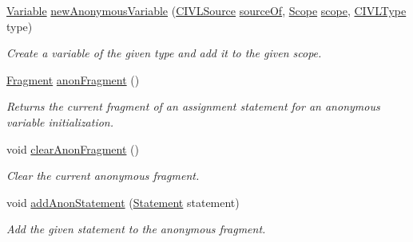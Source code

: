 \begin{DoxyCompactItemize}
\hyperlink{interfaceedu_1_1udel_1_1cis_1_1vsl_1_1civl_1_1model_1_1IF_1_1variable_1_1Variable}{Variable} \hyperlink{classedu_1_1udel_1_1cis_1_1vsl_1_1civl_1_1model_1_1common_1_1CommonModelFactory_a6803d8c7acd197424c72bef1975c9cba}{new\+Anonymous\+Variable} (\hyperlink{interfaceedu_1_1udel_1_1cis_1_1vsl_1_1civl_1_1model_1_1IF_1_1CIVLSource}{C\+I\+V\+L\+Source} \hyperlink{classedu_1_1udel_1_1cis_1_1vsl_1_1civl_1_1model_1_1common_1_1CommonModelFactory_afd3890efdff35b4597ab7ed14fbeffae}{source\+Of}, \hyperlink{interfaceedu_1_1udel_1_1cis_1_1vsl_1_1civl_1_1model_1_1IF_1_1Scope}{Scope} \hyperlink{classedu_1_1udel_1_1cis_1_1vsl_1_1civl_1_1model_1_1common_1_1CommonModelFactory_ace176067c807333f8832ee6b7ffcddfa}{scope}, \hyperlink{interfaceedu_1_1udel_1_1cis_1_1vsl_1_1civl_1_1model_1_1IF_1_1type_1_1CIVLType}{C\+I\+V\+L\+Type} type)
\begin{DoxyCompactList}\small\item\em Create a variable of the given type and add it to the given scope. \end{DoxyCompactList}\item 
\hyperlink{interfaceedu_1_1udel_1_1cis_1_1vsl_1_1civl_1_1model_1_1IF_1_1Fragment}{Fragment} \hyperlink{classedu_1_1udel_1_1cis_1_1vsl_1_1civl_1_1model_1_1common_1_1CommonModelFactory_a1ba6a95c6ef2119f7bace4ba8e02d6fa}{anon\+Fragment} ()
\begin{DoxyCompactList}\small\item\em Returns the current fragment of an assignment statement for an anonymous variable initialization. \end{DoxyCompactList}\item 
void \hyperlink{classedu_1_1udel_1_1cis_1_1vsl_1_1civl_1_1model_1_1common_1_1CommonModelFactory_a940c4530ef56e80a8bd9f4e69270dd22}{clear\+Anon\+Fragment} ()
\begin{DoxyCompactList}\small\item\em Clear the current anonymous fragment. \end{DoxyCompactList}\item 
void \hyperlink{classedu_1_1udel_1_1cis_1_1vsl_1_1civl_1_1model_1_1common_1_1CommonModelFactory_a124af94602c84cfe5a48f8c889ff7923}{add\+Anon\+Statement} (\hyperlink{interfaceedu_1_1udel_1_1cis_1_1vsl_1_1civl_1_1model_1_1IF_1_1statement_1_1Statement}{Statement} statement)
\begin{DoxyCompactList}\small\item\em Add the given statement to the anonymous fragment. \end{DoxyCompactList}\item 

\end{DoxyCompactItemize}
